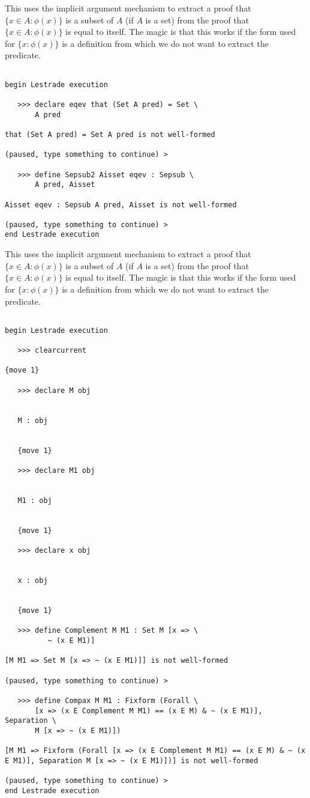 \documentclass[12pt]{article}
\begin{document}
This uses the implicit argument mechanism to extract a proof that $\{x \in A:\phi(x)\}$ is a subset of $A$ (if $A$ is a set) from the proof that $\{x \in A:\phi(x)\}$ is equal to itself.
The magic is that this works if the form used for $\{x : \phi(x)\}$ is a definition from which we do not want to extract the predicate.

\begin{verbatim}

begin Lestrade execution

   >>> declare eqev that (Set A pred) = Set \
       A pred

that (Set A pred) = Set A pred is not well-formed

(paused, type something to continue) >

   >>> define Sepsub2 Aisset eqev : Sepsub \
       A pred, Aisset

Aisset eqev : Sepsub A pred, Aisset is not well-formed

(paused, type something to continue) >
end Lestrade execution
\end{verbatim}

This uses the implicit argument mechanism to extract a proof that $\{x \in A:\phi(x)\}$ is a subset of $A$ (if $A$ is a set) from the proof that $\{x \in A:\phi(x)\}$ is equal to itself.
The magic is that this works if the form used for $\{x : \phi(x)\}$ is a definition from which we do not want to extract the predicate.

\begin{verbatim}

begin Lestrade execution

   >>> clearcurrent

{move 1}

   >>> declare M obj


   M : obj


   {move 1}

   >>> declare M1 obj


   M1 : obj


   {move 1}

   >>> declare x obj


   x : obj


   {move 1}

   >>> define Complement M M1 : Set M [x => \
          ~ (x E M1)]

[M M1 => Set M [x => ~ (x E M1)]] is not well-formed

(paused, type something to continue) >

   >>> define Compax M M1 : Fixform (Forall \
       [x => (x E Complement M M1) == (x E M) & ~ (x E M1)], Separation \
       M [x => ~ (x E M1)])

[M M1 => Fixform (Forall [x => (x E Complement M M1) == (x E M) & ~ (x E M1)], Separation M [x => ~ (x E M1)])] is not well-formed

(paused, type something to continue) >
end Lestrade execution
\end{verbatim}
\end{document}
